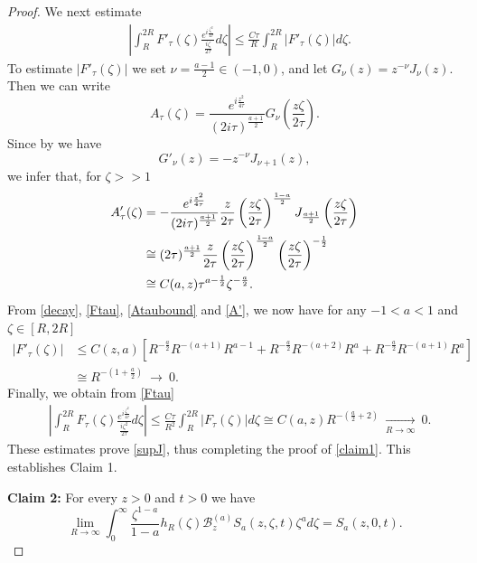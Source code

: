 \documentclass[11pt,letter]{amsart}
\newcommand{\Ba}{\mathscr B_z^{(a)}}
\numberwithin{equation}{section}
\numberwithin{equation}{section}
\begin{document}
\begin{proof}
 
We next estimate 
\begin{align*}
& \left|\int_R^{2R} F'_\tau(\zeta) \frac{e^{i \frac{\zeta^2}{4\tau}}}{\frac{i\zeta}{2\tau} } d\zeta\right|\le \frac{C\tau}{R} \int_R^{2R} |F'_\tau(\zeta)| d\zeta.
\end{align*}
To estimate $|F'_\tau(\zeta)|$ we set $\nu = \frac{a-1}2\in (-1,0)$, and let $G_\nu(z) = z^{-\nu} J_{\nu}(z)$. Then we can write
\[
A_\tau(\zeta) = \frac{e^{i \frac{z^2}{4\tau}}}{(2i\tau)^{\frac{a+1}2}}  G_\nu\left(\frac{z\zeta}{2\tau}\right).
\]
Since by \cite[(5.3.5) on p.103]{Le} we have 
\[
G'_\nu(z) = - z^{-\nu} J_{\nu+1}(z),
\]
we infer that, for $\zeta>>1$
\begin{align}\label{A'}
A'_\tau(\zeta) & = - \frac{e^{i \frac{z^2}{4\tau}}}{(2i\tau)^{\frac{a+1}2}} \frac{z}{2\tau} \left(\frac{z\zeta}{2\tau}\right)^{\frac{1-a}2} J_{\frac{a+1}2}\left(\frac{z\zeta}{2\tau}\right)
\\
& \cong {(2\tau)^{\frac{a+1}2}} \frac{z}{2\tau} \left(\frac{z\zeta}{2\tau}\right)^{\frac{1-a}2} \left(\frac{z\zeta}{2\tau}\right)^{-\frac 12}
\notag
\\
& \cong C(a,z) \tau^{a-\frac 12} \zeta^{-\frac{a}2}. 
\notag
\end{align} 
From \eqref{decay}, \eqref{Ftau}, \eqref{Ataubound} and \eqref{A'}, we now have for any $-1<a<1$ and $\zeta\in [R,2R]$
\begin{align*}
|F'_\tau(\zeta)| & \le C(z,a) \left[R^{-\frac a2} R^{-(a+1)} R^{a-1} + R^{-\frac a2}R^{-(a+2)} R^{a} + R^{-\frac a2} R^{-(a+1)} R^a\right]
\\
& \cong R^{-(1+\frac{a}{2})}\ \longrightarrow\ 0.
\end{align*}
Finally, we obtain from \eqref{Ftau}
\begin{align*}
& \left|\int_R^{2R} F_\tau(\zeta) \frac{e^{i \frac{\zeta^2}{4\tau}}}{\frac{i\zeta^2}{2\tau} } d\zeta\right|\le \frac{C\tau}{R^2} \int_R^{2R} |F_\tau(\zeta)| d\zeta\cong  C(a,z) R^{-(\frac{a}2+2)}\ \underset{R\to \infty}{\longrightarrow}\ 0.
\end{align*}
These estimates prove \eqref{supJ}, thus completing the proof of \eqref{claim1}. This establishes Claim 1.



\vskip 0.2in

\noindent \textbf{Claim 2:} For every $z>0$ and $t>0$ we have
\begin{equation}\label{claim2}
\lim_{R\to\infty}
\int_0^\infty
\frac{\zeta^{1-a}}{1-a}
h_R(\zeta)
\Ba S_a(z,\zeta,t) \zeta^a d\zeta =
S_a(z,0,t).
\end{equation}


\end{proof}
\end{document}
